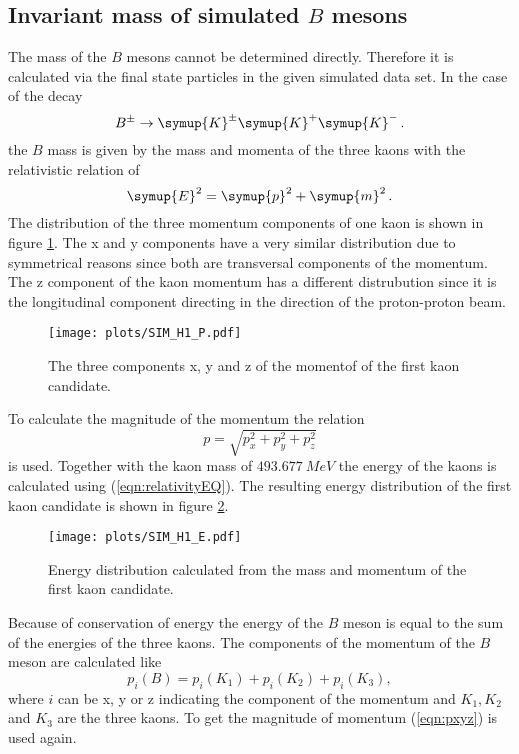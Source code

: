 \subsection{Invariant mass of simulated $B$ mesons}
The mass of the $B$ mesons cannot be determined directly.
Therefore it is calculated via the final state particles in the given simulated data set.
In the case of the decay
\begin{equation*}
  B^{\pm} \to \symup{K}^{\pm} \symup{K}^{+} \symup{K}^{-}\,.
\end{equation*}
the $B$ mass is given by the mass and momenta of the three kaons with the relativistic relation of
\begin{equation}
  \symup{E}^2 = \symup{p}^2 + \symup{m}^2\,.
  \label{eqn:relativityEQ}
\end{equation}
The distribution of the three momentum components of one kaon is shown in figure \ref{fig:KP}.
The x and y components have a very similar distribution due to symmetrical reasons since both are transversal components of the momentum.
The z component of the kaon momentum has a different distrubution since it is the longitudinal component directing in the direction of the proton-proton beam.
\begin{figure}[!htb]
  \centering
  \texttt{[image: plots/SIM\_H1\_P.pdf]}
  \caption{The three components x, y and z of the momentof of the first kaon candidate.}
  \label{fig:KP}
\end{figure}
To calculate the magnitude of the momentum the relation
\begin{equation}
  p = \sqrt{p_x^2+p_y^2+p_z^2} \label{eqn:pxyz}
\end{equation}
is used.
Together with the kaon mass of $\SI{493.677}{MeV}$ \cite{pdg} the energy of the kaons is calculated using (\ref{eqn:relativityEQ}).
The resulting energy distribution of the first kaon candidate is shown in figure \ref{fig:KE}.
\begin{figure}[!htb]
  \centering
  \texttt{[image: plots/SIM\_H1\_E.pdf]}
  \caption{Energy distribution calculated from the mass and momentum of the first kaon candidate.}
  \label{fig:KE}
\end{figure}
Because of conservation of energy the energy of the $B$ meson is equal to the sum of the energies of the three kaons.
The components of the momentum of the $B$ meson are calculated like
\begin{equation}
  p_i(B)=p_i(K_1)+p_i(K_2)+p_i(K_3),
\end{equation}
where $i$ can be x, y or z indicating the component of the momentum and $K_1, K_2$ and $K_3$ are the three kaons.
To get the magnitude of momentum (\ref{eqn:pxyz}) is used again.

